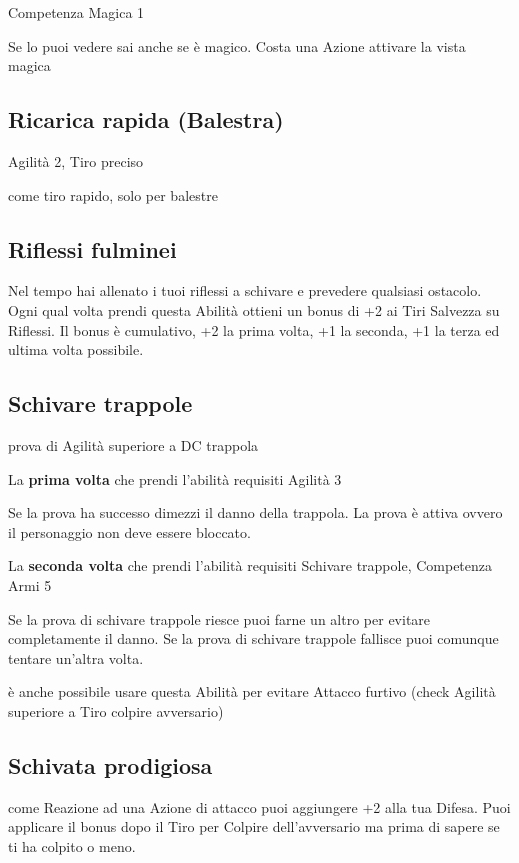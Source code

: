 \documentclass[a4paper,11pt,twoside,openany]{book}
\begin{document}
Competenza Magica 1

Se lo puoi vedere sai anche se è magico. Costa una Azione attivare la vista magica

\subsection{Ricarica rapida (Balestra)}

Agilità 2, Tiro preciso

come tiro rapido, solo per balestre

\subsection{Riflessi fulminei}

Nel tempo hai allenato i tuoi riflessi a schivare e prevedere qualsiasi ostacolo. Ogni qual volta prendi questa Abilità ottieni un bonus di +2 ai Tiri Salvezza su Riflessi. Il bonus è cumulativo, +2 la prima volta, +1 la seconda, +1 la terza ed ultima volta possibile.

\subsection{Schivare trappole}

prova di Agilità superiore a DC trappola

La \textbf{prima volta} che prendi l'abilità requisiti Agilità 3

Se la prova ha successo dimezzi il danno della trappola. La prova è attiva ovvero il personaggio non deve essere bloccato.

La \textbf{seconda volta} che prendi l'abilità requisiti Schivare trappole, Competenza Armi 5

Se la prova di schivare trappole riesce puoi farne un altro per evitare completamente il danno. Se la prova di schivare trappole fallisce puoi comunque tentare un'altra volta.

è anche possibile usare questa Abilità per evitare Attacco furtivo (check Agilità superiore a Tiro colpire avversario)

\subsection{Schivata prodigiosa}

come Reazione ad una Azione di attacco puoi aggiungere +2 alla tua Difesa. Puoi applicare il bonus dopo il Tiro per Colpire dell'avversario ma prima di sapere se ti ha colpito o meno.
\end{document}
